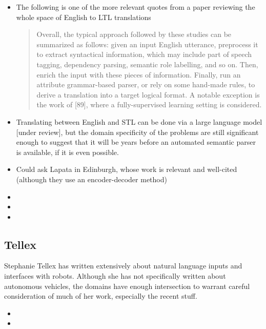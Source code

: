 \documentclass[a4paper, 11pt]{article}
\begin{document}
\begin{itemize}
\item  The following is one of the more relevant quotes from a paper reviewing
  the whole space of English to LTL translations \begin{quote}
Overall, the typical approach followed by these studies can be summarized as follows:
given an input English utterance, preprocess it to extract syntactical information, which may
include part of speech tagging, dependency parsing, semantic role labelling, and so on. Then,
enrich the input with these pieces of information. Finally, run an attribute grammar-based
parser, or rely on some hand-made rules, to derive a translation into a target logical format.
A notable exception is the work of [89], where a fully-supervised learning setting is considered.
\cite{brunello_et_al}
\end{quote}
\item Translating between English and STL can be done via a large language model 
\cite{he2021english} [under review], but the domain specificity of the problems
are still significant enough to suggest that it will be years before an
automated semantic parser is available, if it is even possible. 
\item Could ask Lapata in Edinburgh, whose work \cite{dong-lapata-2016-language}
  is relevant and well-cited (although they use an encoder-decoder method)
\item
\item
\item

\end{itemize}

\subsection{Tellex}

Stephanie Tellex has written extensively about natural language inputs and
interfaces with robots. Although she has not specifically written about
autonomous vehicles, the domains have enough intersection to warrant careful
consideration of much of her work, especially the recent stuff.

\begin{itemize}

\item
\item

\end{itemize}


\printbibliography
\end{document}
